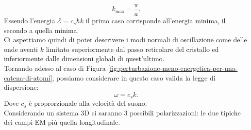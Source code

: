 \[
	k_{\text{max}} = \frac{\pi}{a}
.\] 
Essendo l'energia $\mathcal{E} = c_s \hbar k$ il primo caso corrisponde all'energia minima, il secondo a quella minima.\\
Ci aspettiamo quindi di poter descrivere i  modi normali di oscillazione come delle onde aventi $k$ limitato superiormente dal passo reticolare del cristallo ed inferiormente dalle dimensioni globali di quest'ultimo.\\
Tornando adesso al caso di Figura \ref{fig:perturbazione-meno-energetica-per-una-catena-di-atomi}, possiamo considerare in questo caso valida la legge di dispersione:
\[
	\omega = c_sk
.\] 
Dove $c_s$ è proprorzionale alla velocità del suono.\\
Considerando un sistema 3D ci saranno 3 possibili polarizzazioni: le due tipiche dei campi EM più quella longitudinale.\\
